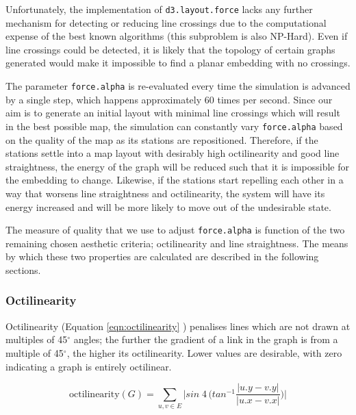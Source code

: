 Unfortunately, the implementation of \texttt{d3.layout.force} lacks any further mechanism for detecting or reducing line crossings due to the computational expense of the best known algorithms (this subproblem is also NP-Hard). Even if line crossings could be detected, it is likely that the topology of certain graphs generated would make it impossible to find a planar embedding with no crossings.

The parameter \texttt{force.alpha} is re-evaluated every time the simulation is advanced by a single step, which happens approximately 60 times per second. Since our aim is to generate an initial layout with minimal line crossings which will result in the best possible map, the simulation can constantly vary \texttt{force.alpha} based on the quality of the map as its stations are repositioned. Therefore, if the stations settle into a map layout with desirably high octilinearity and good line straightness, the energy of the graph will be reduced such that it is impossible for the embedding to change. Likewise, if the stations start repelling each other in a way that worsens line straightness and octilinearity, the system will have its energy increased and will be more likely to move out of the undesirable state.

The measure of quality that we use to adjust \texttt{force.alpha} is function of the two remaining chosen aesthetic criteria; octilinearity and line straightness. The means by which these two properties are calculated are described in the following sections.

\subsubsection{Octilinearity}

Octilinearity (Equation \ref{eqn:octilinearity} \citep{AutomaticMetroMapLayoutThesis}) penalises lines which are not drawn at multiples of 45$^{\circ}$ angles; the further the gradient of a link in the graph is from a multiple of 45$^{\circ}$, the higher its octilinearity. Lower values are desirable, with zero indicating a graph is entirely octilinear. 

\begin{equation}
	\text{octilinearity}(G) = \sum_{u, v\in E}\bigg|sin\;4\,\bigg(tan^{-1}\frac{|u.y - v.y|}{|u.x - v.x|}\bigg)\bigg|
\label{eqn:octilinearity}
\end{equation}

